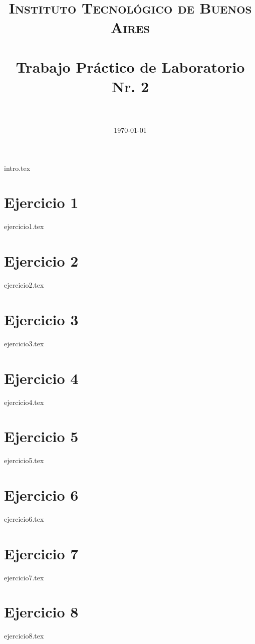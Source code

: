 
\setcounter{secnumdepth}{0}
\title{
	\normalfont \normalsize \textsc{Instituto Tecnol\'ogico de Buenos Aires} \\ [25pt]
	\horrule{2pt} \\[0.4cm]
	\huge Trabajo Pr\'actico de Laboratorio Nr. 2 \\
	\horrule{2pt} \\[0cm]
}
\date{\today}




\maketitle
{intro.tex}

\newpage


\tableofcontents





\ifunoporpagina %
\newpage
\fi
\section{Ejercicio 1}
{ejercicio1.tex}
\ifunoporpagina
\newpage
\fi
\section{Ejercicio 2}
{ejercicio2.tex}
\ifunoporpagina
\newpage
\fi
\section{Ejercicio 3}
{ejercicio3.tex}
\ifunoporpagina
\newpage
\fi
\section{Ejercicio 4}
{ejercicio4.tex}
\ifunoporpagina
\newpage
\fi
\section{Ejercicio 5}
{ejercicio5.tex}
\ifunoporpagina
\newpage
\fi
\section{Ejercicio 6}
{ejercicio6.tex}
\ifunoporpagina
\newpage
\fi
\section{Ejercicio 7}
{ejercicio7.tex}
\ifunoporpagina
\newpage
\fi
\section{Ejercicio 8}
{ejercicio8.tex}




